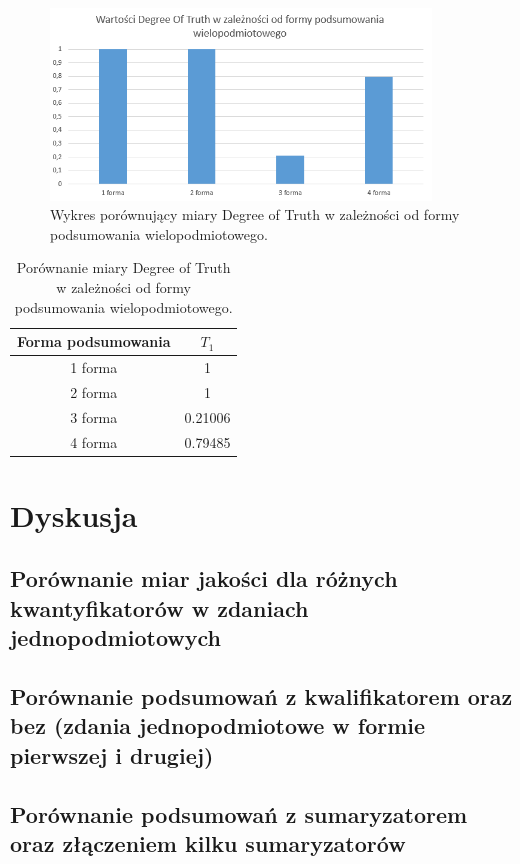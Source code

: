 \documentclass{classrep}
\begin{document}
	\begin{figure}[h!]
		\centering
		\includegraphics[width=0.9\textwidth]{ex/4.png}
		\caption{Wykres porównujący miary Degree of Truth w zależności od formy podsumowania wielopodmiotowego.}
		\label{wyniki4}
	\end{figure}
	
	\begin{table}[h!]
		\centering
		\begin{tabular} {c c}
			\hline
			\textbf{Forma podsumowania} & \textbf{$T_1$} \\ [0.5ex] 
			\hline	
			\hline 
			1 forma & 1 \\ 
			2 forma & 1 \\ 
			3 forma & 0.21006 \\
			4 forma & 0.79485 \\     
			\hline			
		\end{tabular}
		\caption{Porównanie miary Degree of Truth w zależności od formy podsumowania wielopodmiotowego. }
		\label{tabelaex4}
	\end{table}
	
	\section{Dyskusja} %
	\subsection{Porównanie miar jakości dla różnych kwantyfikatorów w zdaniach jednopodmiotowych}
	
	\subsection{Porównanie podsumowań z kwalifikatorem oraz bez (zdania jednopodmiotowe w formie pierwszej i drugiej)}
	
	\subsection{Porównanie podsumowań z sumaryzatorem oraz złączeniem kilku sumaryzatorów}
	
\end{document}

